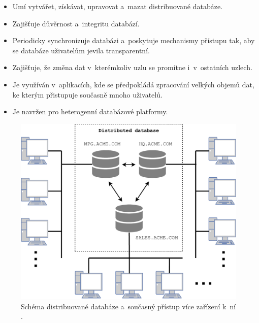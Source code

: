 \begin{itemize}
\item Umí vytvářet, získávat, upravovat a~mazat distribuované databáze.

\item Zajišťuje důvěrnost a~integritu databází.

\item Periodicky synchronizuje databázi a~poskytuje mechanismy přístupu tak, aby se databáze uživatelům jevila transparentní.

\item Zajišťuje, že změna dat v~kterémkoliv uzlu se promítne i~v~ostatních uzlech.

\item Je využíván v~aplikacích, kde se předpokládá zpracování velkých objemů dat, ke kterým přistupuje současně mnoho uživatelů.

\item Je navržen pro heterogenní databázové platformy.
\end{itemize}

\begin{figure}[!h]
  \centering
  \includegraphics[width=13cm]{template-fig/DistributedDatabase.pdf}
  \caption{Schéma distribuované databáze a~současný přístup více zařízení k~ní \cite{distributedDBMSPic}.}
  \label{FIG_DistrDB}
\end{figure}

